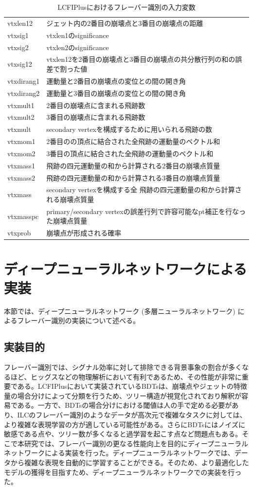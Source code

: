 \begin{table}[H]
\begin{tabular}{ l | l }
   vtxlen12 & ジェット内の2番目の崩壊点と3番目の崩壊点の距離\\
   vtxsig1 & vtxlen1のsignificance\\
   vtxsig2 & vtxlen2のsignificance\\
   vtxsig12 & vtxlen12を2番目の崩壊点と3番目の崩壊点の共分散行列の和の誤差で割った値\\
   vtxdirang1 & 運動量と2番目の崩壊点の変位との間の開き角\\
   vtxdirang2 & 運動量と3番目の崩壊点の変位との間の開き角\\
   vtxmult1 & 2番目の崩壊点に含まれる飛跡数\\
   vtxmult2 & 3番目の崩壊点に含まれる飛跡数\\
   vtxmult & secondary vertexを構成するために用いられる飛跡の数\\
   vtxmom1 & 2番目のの頂点に結合された全飛跡の運動量のベクトル和\\
   vtxmom2 & 3番目の頂点に結合された全飛跡の運動量のベクトル和\\
   vtxmass1 & 飛跡の四元運動量の和から計算される2番目の崩壊点質量\\
   vtxmass2 & 飛跡の四元運動量の和から計算される3番目の崩壊点質量\\
   vtxmass & secondary vertexを構成する全 飛跡の四元運動量の和から計算される崩壊点質量\\
   vtxmasspc & primary/secondary vertexの誤差行列で許容可能なpt補正を行なった崩壊点質量\\
   vtxprob & 崩壊点が形成される確率\\
   \hline
  \end{tabular}
  \caption{LCFIPlusにおけるフレーバー識別の入力変数}
 \label{lcfiplusin}
\end{table}
\section{ディープニューラルネットワークによる実装}
本節では、ディープニューラルネットワーク (多層ニューラルネットワーク) によるフレーバー識別の実装について述べる。
\subsection{実装目的}
フレーバー識別では、シグナル効率に対して排除できる背景事象の割合が多くなるほど、ヒッグスなどの物理解析において有利であるため、その性能が非常に重要である。LCFIPlusにおいて実装されているBDTsは、崩壊点やジェットの特徴量の場合分けによって分類を行うため、ツリー構造が視覚化されており解釈が容易である。一方で、BDTsの場合分けにおける閾値は人の手で定める必要があり、ILCのフレーバー識別のようなデータが高次元で複雑なタスクに対しては、より複雑な表現学習の方が適している可能性がある。さらにBDTsにはノイズに敏感である点や、ツリー数が多くなると過学習を起こす点など問題点もある。そこで本研究では、フレーバー識別の更なる性能向上を目的にディープニューラルネットワークによる実装を行った。ディープニューラルネットワークでは、データから複雑な表現を自動的に学習することができる。そのため、より最適化したモデルの獲得を目指すため、ディープニューラルネットワークでの実装を行った。
